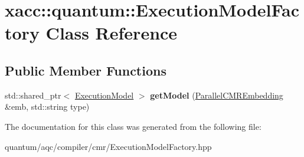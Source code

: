 \hypertarget{a00057}{}\section{xacc\+:\+:quantum\+:\+:Execution\+Model\+Factory Class Reference}
\label{a00057}
\subsection*{Public Member Functions}
\begin{DoxyCompactItemize}
\item 
std\+::shared\+\_\+ptr$<$ \hyperlink{a00055}{Execution\+Model} $>$ {\bfseries get\+Model} (\hyperlink{a00093}{Parallel\+C\+M\+R\+Embedding} \&emb, std\+::string type)\hypertarget{a00057_a730ee21c5ee3baad954834946e92ecd2}{}\label{a00057_a730ee21c5ee3baad954834946e92ecd2}

\end{DoxyCompactItemize}


The documentation for this class was generated from the following file\+:\begin{DoxyCompactItemize}
\item 
quantum/aqc/compiler/cmr/\+Execution\+Model\+Factory.\+hpp\end{DoxyCompactItemize}
